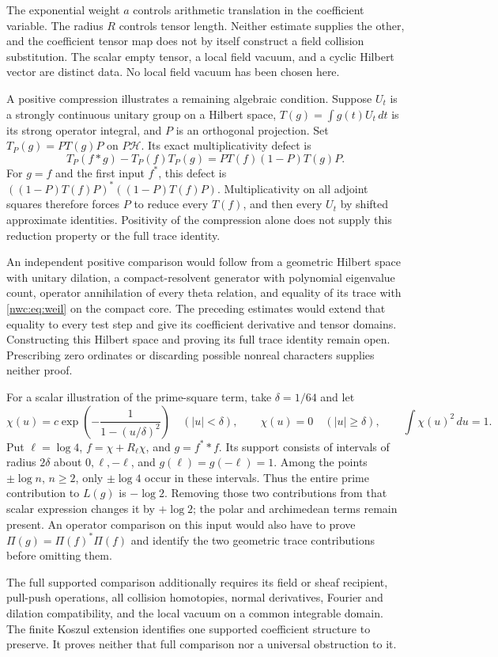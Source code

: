 The exponential weight $a$ controls arithmetic translation in the
coefficient variable. The radius $R$ controls tensor length.
Neither estimate supplies the other, and the coefficient tensor map
does not by itself construct a field collision substitution.
The scalar empty tensor, a local field vacuum, and a cyclic Hilbert
vector are distinct data. No local field vacuum has been chosen here.

A positive compression illustrates a remaining algebraic condition.
Suppose $U_t$ is a strongly continuous unitary group on a Hilbert
space, $T(g)=\int g(t)U_t\,dt$ is its strong operator integral,
and $P$ is an orthogonal projection. Set $T_P(g)=PT(g)P$ on
$P\mathcal H$. Its exact multiplicativity defect is
\[
 T_P(f*g)-T_P(f)T_P(g)=PT(f)(1-P)T(g)P.
\]
For $g=f$ and the first input $f^*$, this defect is
$((1-P)T(f)P)^*((1-P)T(f)P)$.
Multiplicativity on all adjoint squares therefore forces $P$ to
reduce every $T(f)$, and then every $U_t$ by shifted approximate
identities. Positivity of the compression alone does not supply
this reduction property or the full trace identity.

An independent positive comparison would follow from a geometric
Hilbert space with unitary dilation, a compact-resolvent generator
with polynomial eigenvalue count, operator annihilation of every
theta relation, and equality of its trace with \eqref{nwc:eq:weil}
on the compact core. The preceding estimates would extend that
equality to every test step and give its coefficient derivative and
tensor domains. Constructing this Hilbert space and proving its full
trace identity remain open. Prescribing zero ordinates or discarding
possible nonreal characters supplies neither proof.

For a scalar illustration of the prime-square term, take
$\delta=1/64$ and let
\[
 \chi(u)=c\exp\!\left(-\frac1{1-(u/\delta)^2}\right)
 \quad(|u|<\delta),\qquad \chi(u)=0\quad(|u|\geq\delta),
 \qquad \int\chi(u)^2\,du=1.
\]
Put $\ell=\log4$, $f=\chi+R_\ell\chi$, and $g=f^**f$.
Its support consists of intervals of radius $2\delta$ about
$0,\ell,-\ell$, and $g(\ell)=g(-\ell)=1$.
Among the points $\pm\log n$, $n\geq2$, only $\pm\log4$ occur
in these intervals. Thus the entire prime contribution to $L(g)$
is $-\log2$. Removing those two contributions from that scalar
expression changes it by $+\log2$; the polar and archimedean terms
remain present. An operator comparison on this input would also
have to prove $\Pi(g)=\Pi(f)^*\Pi(f)$ and identify the two
geometric trace contributions before omitting them.

The full supported comparison additionally requires its field or sheaf
recipient, pull-push operations, all collision homotopies, normal
derivatives, Fourier and dilation compatibility, and the local vacuum
on a common integrable domain. The finite Koszul extension identifies
one supported coefficient structure to preserve. It proves neither
that full comparison nor a universal obstruction to it.

